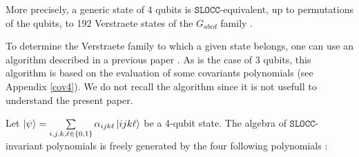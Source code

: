 \documentclass[a4paper,12pt,fleqn]{article}
\newcommand\SLOCC{\mathtt{SLOCC}}
\begin{document}
More precisely, a generic state of 4 qubits is $\SLOCC$-equivalent, up to permutations of the qubits,  to 192 Verstraete states of the  $G_{abcd}$ family \cite{2017HLT}.

To determine the Verstraete family to which a given state belongs, one can use an algorithm described in a previous paper \cite{2017HLT}.
As is the case of 3 qubits, this algorithm is based on the evaluation of some covariants polynomials (see Appendix \ref{cov4}). We do not recall the algorithm since it is not usefull to understand the present paper.\medskip

Let $\ket{\psi}=\sum\limits_{i,j,k,\ell\in\{0,1\}}\alpha_{ijk\ell}\ket{ijk\ell}$ be a 4-qubit state. The algebra of $\SLOCC$-invariant polynomials is freely generated by the four following polynomials \cite{2003LT}:
\end{document}
